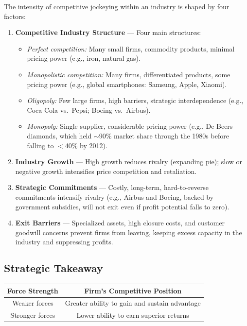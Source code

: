 \documentclass[11pt, letterpaper]{article}
\begin{document}
The intensity of competitive jockeying within an industry is shaped by four factors:

\begin{enumerate}[leftmargin=*, label=\textbf{\arabic*.}]
  \item \textbf{Competitive Industry Structure} --- Four main structures:
    \begin{itemize}[leftmargin=*]
      \item \textit{Perfect competition:} Many small firms, commodity products, minimal pricing power (e.g., iron, natural gas).
      \item \textit{Monopolistic competition:} Many firms, differentiated products, some pricing power (e.g., global smartphones: Samsung, Apple, Xiaomi).
      \item \textit{Oligopoly:} Few large firms, high barriers, strategic interdependence (e.g., Coca-Cola vs.\ Pepsi; Boeing vs.\ Airbus).
      \item \textit{Monopoly:} Single supplier, considerable pricing power (e.g., De Beers diamonds, which held $\sim$90\% market share through the 1980s before falling to $<$40\% by 2012).
    \end{itemize}
  \item \textbf{Industry Growth} --- High growth reduces rivalry (expanding pie); slow or negative growth intensifies price competition and retaliation.
  \item \textbf{Strategic Commitments} --- Costly, long-term, hard-to-reverse commitments intensify rivalry (e.g., Airbus and Boeing, backed by government subsidies, will not exit even if profit potential falls to zero).
  \item \textbf{Exit Barriers} --- Specialized assets, high closure costs, and customer goodwill concerns prevent firms from leaving, keeping excess capacity in the industry and suppressing profits.
\end{enumerate}

\subsection{Strategic Takeaway}

\begin{center}
\begin{tabular}{cc}
\toprule
\textbf{Force Strength} & \textbf{Firm's Competitive Position} \\
\midrule
Weaker forces & Greater ability to gain and sustain advantage \\
Stronger forces & Lower ability to earn superior returns \\
\bottomrule
\end{tabular}
\end{center}
\end{document}
